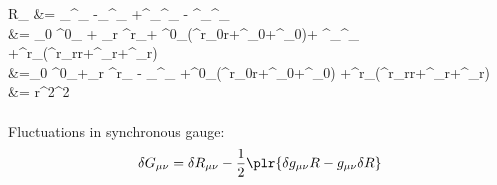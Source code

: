 \documentclass[10pt,letterpaper]{article}
\begin{document}
	R_{\phi\phi} &= \pd_\kappa \Gamma^\kappa_{\phi\phi} -\pd_\phi \Gamma^{\kappa}_{\phi\kappa}
	+\Gamma^{\kappa}_{\alpha\kappa}\Gamma^{\alpha}_{\phi\phi} 
	- \Gamma^{\kappa}_{\alpha \phi}\Gamma^{\alpha}_{\phi\kappa}\\
	&= \pd_0 \Gamma^0_{\phi\phi} + \pd_r \Gamma^r_{\phi\phi}+
	\Gamma^0_{\phi\phi}(\Gamma^r_{0r}+\Gamma^\theta_{0\theta}+\Gamma^\phi_{0\phi})+
	\Gamma^\theta_{\phi\phi}\Gamma^\phi_{\phi\theta}
	+\Gamma^r_{\phi\phi}(\Gamma^r_{rr}+\Gamma^\theta_{\theta r}+\Gamma^{\phi}_{\phi r})\\
	&=\pd_0 \Gamma^0_{\theta\theta}+\pd_r \Gamma^r_{\theta\theta} - \pd_\theta \Gamma^\phi_{\phi\theta}
		+\Gamma^0_{\theta\theta}(\Gamma^r_{0r}+\Gamma^\theta_{0\theta}+\Gamma^\phi_{0\phi})
		+\Gamma^r_{\theta\theta}(\Gamma^r_{rr}+\Gamma^\theta_{\theta r}+\Gamma^{\phi}_{\phi r})\\
	&= r^2\sin^2\theta
\ea
\\ \\
Fluctuations in synchronous gauge:
\[
	\delta G_{\mu\nu} = \delta R_{\mu\nu} - \frac12\plr{\delta g_{\mu\nu}R -g_{\mu\nu}\delta R}
\]
\end{document}
